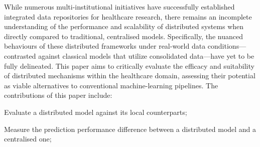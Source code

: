 
While numerous multi-institutional initiatives have successfully established integrated data repositories for healthcare research, there remains an incomplete understanding of the performance and scalability of distributed systems when directly compared to traditional, centralised models. Specifically, the nuanced behaviours of these distributed frameworks under real-world data conditions—contrasted against classical models that utilize consolidated data—have yet to be fully delineated. This paper aims to critically evaluate the efficacy and suitability of distributed mechanisms within the healthcare domain, assessing their potential as viable alternatives to conventional machine-learning pipelines. The contributions of this paper include:

\begin{myitemize}
    \item Evaluate a distributed model against its local counterparts;
    \item Measure the prediction performance difference between a distributed model and a centralised one;

\end{myitemize}
